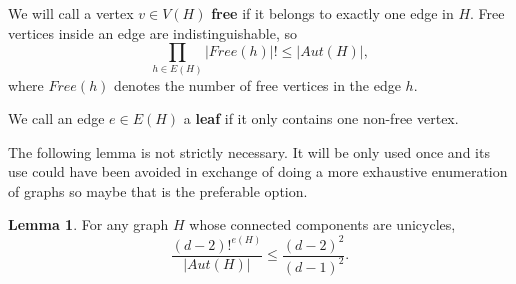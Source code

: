 \documentclass[11pt,notitlepage,a4paper]{article}
\theoremstyle{definition}
\newtheorem*{lemma*}{Lemma}
\begin{document}
\par

We will call a vertex $v\in V(H)$ \textbf{free} if it belongs 
to exactly one edge in $H$. Free vertices inside an edge are
indistinguishable, so 
	\[	\prod_{h\in E(H)} |Free(h)|! \leq |Aut(H)|, \]
where $Free(h)$ denotes the number of free vertices in the edge $h$.\par
We call an edge $e\in E(H)$ a \textbf{leaf} if it only contains one
non-free vertex.  
\par
The following lemma is not strictly necessary. It will be only used once
and its use could have been avoided in exchange of doing a more exhaustive
enumeration of graphs so maybe that is the preferable option. 

\begin{lemma*} For any graph $H$ whose connected components are 
	unicycles,
	\[ \frac{(d-2)!^{e(H)}}{|Aut(H)|} \leq \frac{(d-2)^2}{(d-1)^2}.\]
\end{lemma*}
\end{document}
